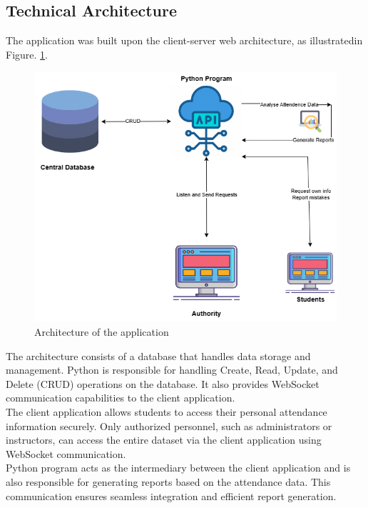 \subsection{Technical Architecture}
The application was built upon the client-server web architecture, as illustratedin Figure.
\ref{fig:arch}. 
\begin{figure}[H]
    \includegraphics[width=\linewidth]{figures/architecture.png}
    \centering
    \caption{Architecture of the application}
    \label{fig:arch}
\end{figure}

The architecture consists of a database that handles data storage and management. Python is responsible for handling Create, Read, Update, and Delete (CRUD) operations on the database. It also provides WebSocket communication capabilities to the client application.\\

The client application allows students to access their personal attendance information securely. Only authorized personnel, such as administrators or instructors, can access the entire dataset via the client application using WebSocket communication.\\

Python program acts as the intermediary between the client application and is also responsible for generating reports based on the attendance data. This communication ensures seamless integration and efficient report generation.\\

